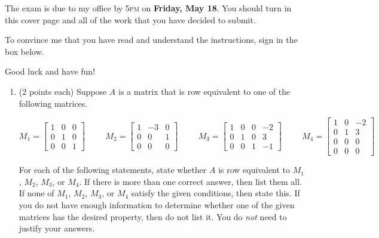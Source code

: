 \documentclass[11pt]{article}
\theoremstyle{definition}
\begin{document}
The exam is due to my office by 5\textsc{pm} on \textbf{Friday, May 18}.  You should turn in this cover page and all of the work that you have decided to submit.

\bigskip

To convince me that you have read and understand the instructions, sign in the box below.

\bigskip


\bigskip

Good luck and have fun!

\newpage

\begin{enumerate}

\item (2 points each) Suppose $A$ is a matrix that is row equivalent to one of the following matrices.

\[M_1 = \begin{bmatrix}1 & 0 & 0 \\0 & 1 & 0 \\0 & 0 & 1\end{bmatrix} \hspace{1cm} M_2 = \begin{bmatrix}1 & -3 & 0 \\0 & 0 & 1 \\0 & 0 & 0\end{bmatrix}\hspace{1cm} M_3=\begin{bmatrix}1 & 0 & 0 & -2 \\0 & 1 & 0 & 3 \\0 & 0 & 1 & -1\end{bmatrix} \hspace{1cm} M_4=\begin{bmatrix}1 & 0 & -2 \\0 & 1 & 3 \\0 & 0 & 0\\ 0 & 0 & 0\end{bmatrix}\]

For each of the following statements, state whether $A$ is row equivalent to $M_1$, $M_2$, $M_{3}$, or $M_{4}$.  If there is more than one correct answer, then list them all.  If none of $M_1$, $M_2$, $M_{3}$, or $M_4$ satisfy the given conditions, then state this. If you do not have enough information to determine whether one of the given matrices has the desired property, then do not list it.  You do \emph{not} need to justify your answers. 


\end{enumerate}
\end{document}
